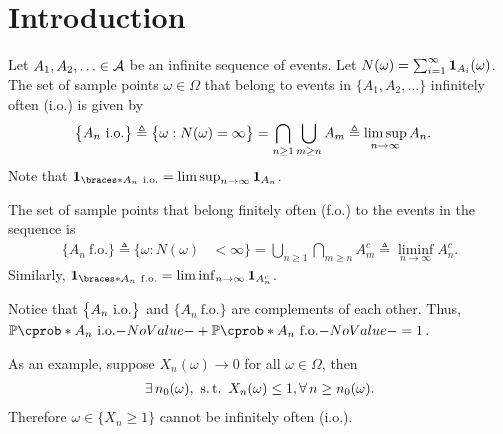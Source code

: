 \documentclass[12pt]{article}
\begin{document}

\section{Introduction}
Let $A_1, A_2, \ldots \in \mathcal{A}$ be an infinite sequence of events. Let $N(\omega) = \sum_{i=1}^{\infty} {\bf 1}_{A_i}(\omega)$. The set of sample points $\omega\in\Omega$ that belong to events in $\{A_1,A_2,\ldots\}$ infinitely often (i.o.) is given by 
\begin{align*} 
\big\{A_n \ \mathrm{i.o.}\big\} \triangleq \big\{\omega: N(\omega) &= \infty\big\} = \bigcap_{n \geq 1} \bigcup_{m \geq n} A_m \triangleq \limsup_{n \to \infty} A_n.
\end{align*}
Note that $\indicator{A_n\io} = \limsup_{n\to\infty}\indicatore{A_n}$.

The set of sample points that belong finitely often (f.o.) to the events in the sequence is 
\begin{align*} 
\big\{A_n \ \text{f.o.}\big\} \triangleq \big\{\omega: N(\omega) &< \infty\big\} = \bigcup_{n \geq 1} \bigcap_{m \geq n} A_m^c \triangleq \liminf_{n \to \infty} A_n^c.
\end{align*}
Similarly, $\indicator{A_n\fo} = \liminf_{n\to\infty}\indicatore{A_n^c}$.

Notice that $\big\{A_n \ \mathrm{i.o.}\big\}$ and $\big\{A_n \ \text{f.o.}\big\}$ are complements of each other. Thus, $\P(A_n \io) + \P(A_n \ \text{f.o.}) = 1$.

As an example, suppose $X_n(\omega) \to 0$ for all $\omega\in\Omega$, then 
\begin{align*}
\exists n_0(\omega),\ \st X_n(\omega) \leq 1, \forall n \geq n_0(\omega).
\end{align*}
Therefore $\omega\in\{X_n \geq 1\}$ cannot be infinitely often (i.o.).
\end{document}

